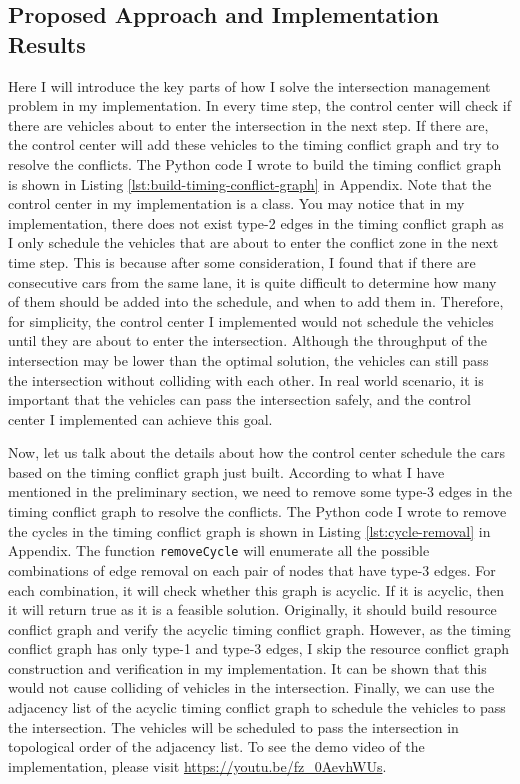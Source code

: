 \documentclass{article}
\begin{document}
\begin{multicols*}{2}
    \section{Proposed Approach and Implementation Results}
    Here I will introduce the key parts of how I solve the intersection management problem in my implementation. In every time step, the control center will check if there are vehicles about to enter the intersection in the next step. If there are, the control center will add these vehicles to the timing conflict graph and try to resolve the conflicts. The Python code I wrote to build the timing conflict graph is shown in Listing \ref{lst:build-timing-conflict-graph} in Appendix. Note that the control center in my implementation is a class. You may notice that in my implementation, there does not exist type-2 edges in the timing conflict graph as I only schedule the vehicles that are about to enter the conflict zone in the next time step. This is because after some consideration, I found that if there are consecutive cars from the same lane, it is quite difficult to determine how many of them should be added into the schedule, and when to add them in. Therefore, for simplicity, the control center I implemented would not schedule the vehicles until they are about to enter the intersection. Although the throughput of the intersection may be lower than the optimal solution, the vehicles can still pass the intersection without colliding with each other. In real world scenario, it is important that the vehicles can pass the intersection safely, and the control center I implemented can achieve this goal.
    
    Now, let us talk about the details about how the control center schedule the cars based on the timing conflict graph just built. According to what I have mentioned in the preliminary section, we need to remove some type-3 edges in the timing conflict graph to resolve the conflicts. The Python code I wrote to remove the cycles in the timing conflict graph is shown in Listing \ref{lst:cycle-removal} in Appendix. The function \texttt{removeCycle} will enumerate all the possible combinations of edge removal on each pair of nodes that have type-3 edges. For each combination, it will check whether this graph is acyclic. If it is acyclic, then it will return true as it is a feasible solution. Originally, it should build resource conflict graph and verify the acyclic timing conflict graph. However, as the timing conflict graph has only type-1 and type-3 edges, I skip the resource conflict graph construction and verification in my implementation. It can be shown that this would not cause colliding of vehicles in the intersection. Finally, we can use the adjacency list of the acyclic timing conflict graph to schedule the vehicles to pass the intersection. The vehicles will be scheduled to pass the intersection in topological order of the adjacency list. To see the demo video of the implementation, please visit \url{https://youtu.be/fz_0AevhWUs}.


\end{multicols*}
\end{document}
